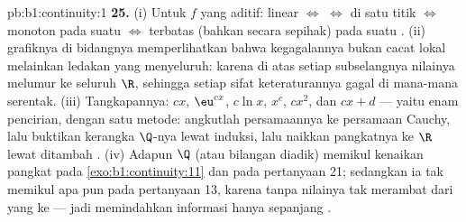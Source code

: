 \begin{solution}{pb:b1:continuity:1}
\textbf{25.} (i) Untuk $f$ yang aditif: linear $\iff$ 
$\iff$  di satu titik $\iff$ monoton pada suatu 
$\iff$ terbatas (bahkan secara sepihak) pada suatu . (ii) 
grafiknya di bidangnya memperlihatkan bahwa kegagalannya bukan cacat
lokal melainkan ledakan yang menyeluruh: karena di atas setiap subselangnya
nilainya melumur ke seluruh $\R$, sehingga setiap sifat keteraturannya
gagal di mana-mana serentak. (iii) Tangkapannya: $cx$, $\eu^{cx}$,
$c\ln x$, $x^c$, $cx^2$, dan $cx + d$ --- yaitu enam pencirian,
dengan satu metode: angkutlah persamaannya ke persamaan Cauchy, lalu buktikan
kerangka $\Q$-nya lewat induksi, lalu naikkan pangkatnya ke $\R$ lewat  ditambah
. (iv) Adapun  $\Q$ (atau bilangan diadik) memikul
kenaikan pangkat pada \cref{exo:b1:continuity:11} dan pada pertanyaan 21; sedangkan ia
tak memikul apa pun pada pertanyaan 13, karena tanpa 
nilainya tak merambat dari  yang  ke  ---
jadi  memindahkan informasi hanya sepanjang .

\end{solution}
